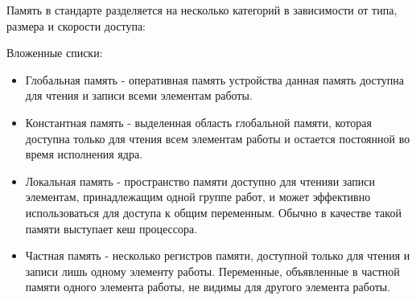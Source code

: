 Память в стандарте разделяется на несколько категорий в зависимости от типа, размера и скорости доступа:

\noindent Вложенные списки:
\begin{itemize}
  \item Глобальная память - оперативная память устройства данная память доступна для чтения и записи всеми элементам работы.
  \item Константная память - выделенная область  глобальной  памяти, которая  доступна только для чтения всем элементам работы и остается постоянной во время исполнения ядра.
  \item Локальная память - пространство памяти доступно для чтенияи записи элементам, принадлежащим одной группе работ, и может эффективно использоваться для доступа к общим переменным. Обычно в качестве такой памяти выступает кеш процессора.
  \item Частная память - несколько регистров памяти, доступной только для чтения и записи лишь одному элементу работы. Переменные, объявленные в частной памяти одного элемента работы, не видимы для другого элемента работы.
\end{itemize}
